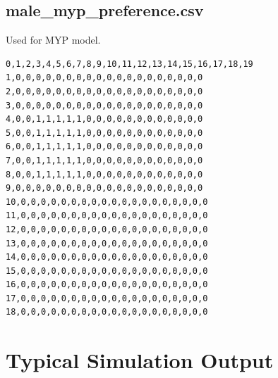 \documentclass[authoryearcitations]{UoYCSproject}
\begin{document}
\section{male\_myp\_preference.csv}
Used for MYP model.
\begin{framed}
\begin{verbatim}
0,1,2,3,4,5,6,7,8,9,10,11,12,13,14,15,16,17,18,19
1,0,0,0,0,0,0,0,0,0,0,0,0,0,0,0,0,0,0,0
2,0,0,0,0,0,0,0,0,0,0,0,0,0,0,0,0,0,0,0
3,0,0,0,0,0,0,0,0,0,0,0,0,0,0,0,0,0,0,0
4,0,0,1,1,1,1,1,0,0,0,0,0,0,0,0,0,0,0,0
5,0,0,1,1,1,1,1,0,0,0,0,0,0,0,0,0,0,0,0
6,0,0,1,1,1,1,1,0,0,0,0,0,0,0,0,0,0,0,0
7,0,0,1,1,1,1,1,0,0,0,0,0,0,0,0,0,0,0,0
8,0,0,1,1,1,1,1,0,0,0,0,0,0,0,0,0,0,0,0
9,0,0,0,0,0,0,0,0,0,0,0,0,0,0,0,0,0,0,0
10,0,0,0,0,0,0,0,0,0,0,0,0,0,0,0,0,0,0,0
11,0,0,0,0,0,0,0,0,0,0,0,0,0,0,0,0,0,0,0
12,0,0,0,0,0,0,0,0,0,0,0,0,0,0,0,0,0,0,0
13,0,0,0,0,0,0,0,0,0,0,0,0,0,0,0,0,0,0,0
14,0,0,0,0,0,0,0,0,0,0,0,0,0,0,0,0,0,0,0
15,0,0,0,0,0,0,0,0,0,0,0,0,0,0,0,0,0,0,0
16,0,0,0,0,0,0,0,0,0,0,0,0,0,0,0,0,0,0,0
17,0,0,0,0,0,0,0,0,0,0,0,0,0,0,0,0,0,0,0
18,0,0,0,0,0,0,0,0,0,0,0,0,0,0,0,0,0,0,0
\end{verbatim}
\end{framed}

\chapter{Typical Simulation Output}
\label{adx:typicalOutput}
\end{document}
